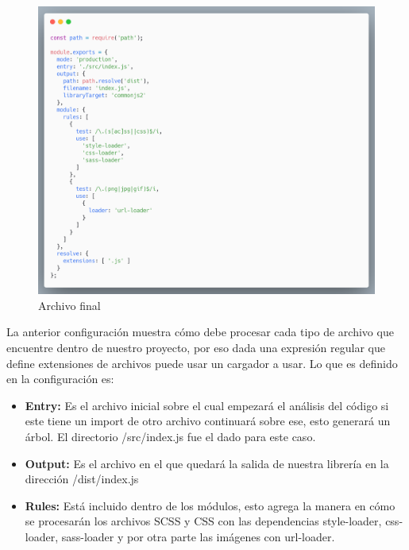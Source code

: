      \begin{figure}[H]
    \includegraphics[width=1\textwidth]{./Imagenes/image2.png}
     \caption[Archivo final]{Archivo final}
         \end{figure}
    \newline
    La anterior configuración muestra cómo debe procesar cada tipo de archivo que encuentre dentro de nuestro proyecto, por eso dada una expresión regular que define extensiones de archivos puede usar un cargador a usar.
    Lo que es definido en la configuración es:
    \begin{itemize}
    \item \textbf{Entry: } Es el archivo inicial sobre el cual empezará el análisis del código si este tiene un import de otro archivo continuará sobre ese, esto generará un árbol. El directorio /src/index.js fue el dado para este caso.
    \item \textbf{Output: } Es el archivo en el que quedará la salida de nuestra librería en la dirección /dist/index.js
    \item \textbf{Rules: }Está incluido dentro de los módulos, esto agrega la manera en cómo se procesarán los archivos SCSS y CSS  con las dependencias style-loader, css-loader, sass-loader y por otra parte las imágenes con url-loader.
    \end{itemize}
    
    
